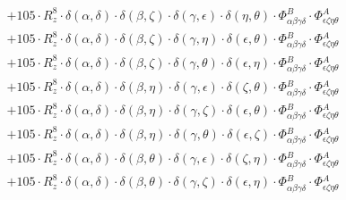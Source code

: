 \documentclass{article}
\begin{document}
\begin{equation}
\begin{array}{c}
 \\[0.2em] 		 + 105 \cdot R_{z}^{8} \cdot \delta{}\left(\alpha{}, \delta{}\right) \cdot \delta{}\left(\beta{}, \zeta{}\right) \cdot \delta{}\left(\gamma{}, \epsilon{}\right) \cdot \delta{}\left(\eta{}, \theta{}\right) \cdot \Phi{}^{B}_{\alpha{}\beta{}\gamma{}\delta{}} \cdot \Phi{}^{A}_{\epsilon{}\zeta{}\eta{}\theta{}} 
 \\[0.2em] 		 + 105 \cdot R_{z}^{8} \cdot \delta{}\left(\alpha{}, \delta{}\right) \cdot \delta{}\left(\beta{}, \zeta{}\right) \cdot \delta{}\left(\gamma{}, \eta{}\right) \cdot \delta{}\left(\epsilon{}, \theta{}\right) \cdot \Phi{}^{B}_{\alpha{}\beta{}\gamma{}\delta{}} \cdot \Phi{}^{A}_{\epsilon{}\zeta{}\eta{}\theta{}} 
 \\[0.2em] 		 + 105 \cdot R_{z}^{8} \cdot \delta{}\left(\alpha{}, \delta{}\right) \cdot \delta{}\left(\beta{}, \zeta{}\right) \cdot \delta{}\left(\gamma{}, \theta{}\right) \cdot \delta{}\left(\epsilon{}, \eta{}\right) \cdot \Phi{}^{B}_{\alpha{}\beta{}\gamma{}\delta{}} \cdot \Phi{}^{A}_{\epsilon{}\zeta{}\eta{}\theta{}} 
 \\[0.2em] 		 + 105 \cdot R_{z}^{8} \cdot \delta{}\left(\alpha{}, \delta{}\right) \cdot \delta{}\left(\beta{}, \eta{}\right) \cdot \delta{}\left(\gamma{}, \epsilon{}\right) \cdot \delta{}\left(\zeta{}, \theta{}\right) \cdot \Phi{}^{B}_{\alpha{}\beta{}\gamma{}\delta{}} \cdot \Phi{}^{A}_{\epsilon{}\zeta{}\eta{}\theta{}} 
 \\[0.2em] 		 + 105 \cdot R_{z}^{8} \cdot \delta{}\left(\alpha{}, \delta{}\right) \cdot \delta{}\left(\beta{}, \eta{}\right) \cdot \delta{}\left(\gamma{}, \zeta{}\right) \cdot \delta{}\left(\epsilon{}, \theta{}\right) \cdot \Phi{}^{B}_{\alpha{}\beta{}\gamma{}\delta{}} \cdot \Phi{}^{A}_{\epsilon{}\zeta{}\eta{}\theta{}} 
 \\[0.2em] 		 + 105 \cdot R_{z}^{8} \cdot \delta{}\left(\alpha{}, \delta{}\right) \cdot \delta{}\left(\beta{}, \eta{}\right) \cdot \delta{}\left(\gamma{}, \theta{}\right) \cdot \delta{}\left(\epsilon{}, \zeta{}\right) \cdot \Phi{}^{B}_{\alpha{}\beta{}\gamma{}\delta{}} \cdot \Phi{}^{A}_{\epsilon{}\zeta{}\eta{}\theta{}} 
 \\[0.2em] 		 + 105 \cdot R_{z}^{8} \cdot \delta{}\left(\alpha{}, \delta{}\right) \cdot \delta{}\left(\beta{}, \theta{}\right) \cdot \delta{}\left(\gamma{}, \epsilon{}\right) \cdot \delta{}\left(\zeta{}, \eta{}\right) \cdot \Phi{}^{B}_{\alpha{}\beta{}\gamma{}\delta{}} \cdot \Phi{}^{A}_{\epsilon{}\zeta{}\eta{}\theta{}} 
 \\[0.2em] 		 + 105 \cdot R_{z}^{8} \cdot \delta{}\left(\alpha{}, \delta{}\right) \cdot \delta{}\left(\beta{}, \theta{}\right) \cdot \delta{}\left(\gamma{}, \zeta{}\right) \cdot \delta{}\left(\epsilon{}, \eta{}\right) \cdot \Phi{}^{B}_{\alpha{}\beta{}\gamma{}\delta{}} \cdot \Phi{}^{A}_{\epsilon{}\zeta{}\eta{}\theta{}} 

\end{array}
\end{equation}
\end{document}
